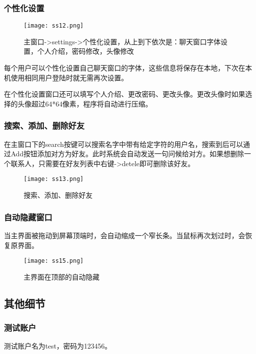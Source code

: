 \documentclass[a4paper,11pt]{article}
\begin{document}
        \subsubsection{个性化设置}
            \begin{figure}[H]
                \centering
                \texttt{[image: ss12.png]}
                \caption{主窗口->settings->个性化设置，从上到下依次是：聊天窗口字体设置，个人介绍，密码修改，头像修改}
            \end{figure}        
            每个用户可以个性化设置自己聊天窗口的字体，这些信息将保存在本地，下次在本机使用相同用户登陆时就无需再次设置。\par
            在个性化设置窗口还可以填写个人介绍、更改密码、更改头像。更改头像时如果选择的头像超过64*64像素，程序将自动进行压缩。
        \subsubsection{搜索、添加、删除好友}            
            在主窗口下的search按键可以搜索名字中带有给定字符的用户名，搜索到后可以通过Add按钮添加对方为好友。此时系统会自动发送一句问候给对方。如果想删除一个联系人，只需要在好友列表中右键->detele即可删除该好友。\par
             \begin{figure}[H]
                \centering
                \texttt{[image: ss13.png]}
                \caption{搜索、添加、删除好友}
            \end{figure}
        \subsubsection{自动隐藏窗口}
            当主界面被拖动到屏幕顶端时，会自动缩成一个窄长条。当鼠标再次划过时，会恢复原界面。
            \begin{figure}[H]
                \centering
                \texttt{[image: ss15.png]}
                \caption{主界面在顶部的自动隐藏}
            \end{figure}
            

    \subsection{其他细节}
        \subsubsection{测试账户}
            测试账户名为test，密码为123456。
\end{document}
